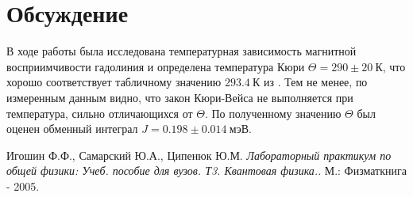 \documentclass[a4paper,12pt]{article}
\theoremstyle{definition}
\begin{document}
\section*{Обсуждение}
В ходе работы была исследована температурная зависимость магнитной восприимчивости гадолиния и определена температура Кюри $\Theta = 290 \pm 20~\text{К}$, что хорошо соответствует табличному значению $293.4~\text{К}$ из \cite{laba}. Тем не менее, по измеренным данным видно, что закон Кюри-Вейса не выполняется при температура, сильно отличающихся от $\Theta$. По полученному значению $\Theta$ был оценен обменный интеграл $J = 0.198\pm 0.014~\text{мэВ}$.


\begin{thebibliography}{9}
Игошин Ф.Ф., Самарский Ю.А., Ципенюк Ю.М.
\textit{Лабораторный практикум по общей физики: Учеб. пособие для вузов. Т3. Квантовая физика.}. 
М.: Физматкнига - 2005.
\end{thebibliography}
\end{document}
